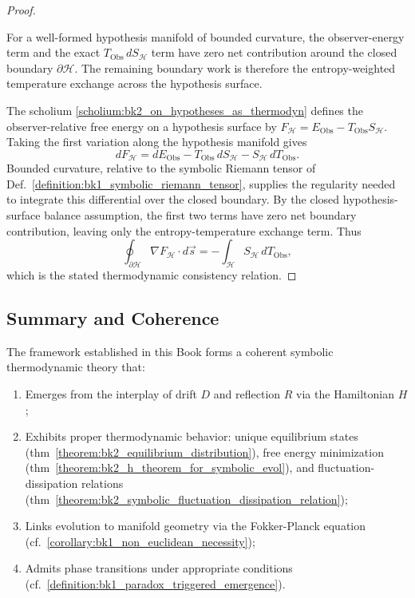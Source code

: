\begin{proof}
\label{proof:bk2_thermodynamic_consistency_hypothesis_manifolds}
\leavevmode

\begin{assumption}
For a well-formed hypothesis manifold of bounded curvature, the observer-energy
term and the exact $T_{\mathrm{Obs}}\,dS_{\mathcal H}$ term have zero net
contribution around the closed boundary $\partial\mathcal H$. The remaining
boundary work is therefore the entropy-weighted temperature exchange across
the hypothesis surface.
\end{assumption}

The scholium \ref{scholium:bk2_on_hypotheses_as_thermodyn} defines the
observer-relative free energy on a hypothesis surface by
$F_{\mathcal H}=E_{\mathrm{Obs}}-T_{\mathrm{Obs}}S_{\mathcal H}$. Taking the
first variation along the hypothesis manifold gives
\[
dF_{\mathcal H}
  = dE_{\mathrm{Obs}}
    -T_{\mathrm{Obs}}\,dS_{\mathcal H}
    -S_{\mathcal H}\,dT_{\mathrm{Obs}} .
\]
Bounded curvature, relative to the symbolic Riemann tensor of
Def.~\ref{definition:bk1_symbolic_riemann_tensor}, supplies the regularity
needed to integrate this differential over the closed boundary. By the closed
hypothesis-surface balance assumption, the first two terms have zero net
boundary contribution, leaving only the entropy-temperature exchange term.
Thus
\[
\oint_{\partial \mathcal{H}} \nabla F_{\mathcal{H}}\cdot d\vec{s}
  = -\int_{\mathcal H} S_{\mathcal H}\,dT_{\mathrm{Obs}},
\]
which is the stated thermodynamic consistency relation.
\end{proof}

\subsection{Summary and Coherence}
\label{subsec:bk2_summary_interpretive_framework}

\begin{theorem} 
\label{theorem:bk2_coherence_of_symbolic_therm} 
The framework established in this Book forms a coherent symbolic thermodynamic theory that:
\begin{enumerate}
    \item Emerges from the interplay of drift $D$ and reflection $R$ via the Hamiltonian $H$;
    \item Exhibits proper thermodynamic behavior: unique equilibrium states (thm~\ref{theorem:bk2_equilibrium_distribution}), free energy minimization (thm~\ref{theorem:bk2_h_theorem_for_symbolic_evol}), and fluctuation-dissipation relations (thm~\ref{theorem:bk2_symbolic_fluctuation_dissipation_relation});
    \item Links evolution to manifold geometry via the Fokker-Planck equation (cf.~\ref{corollary:bk1_non_euclidean_necessity});
    \item Admits phase transitions under appropriate conditions (cf.~\ref{definition:bk1_paradox_triggered_emergence}).
\end{enumerate}
\end{theorem}

